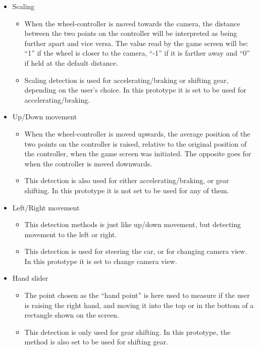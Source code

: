 \pagebreak[4]
\begin{itemize}
\item Scaling
	\begin{itemize}
	\item When the wheel-controller is moved towards the camera, the distance between the two points on the controller will be interpreted as being further apart and vice versa. The value read by the game screen will be: “1” if the wheel is closer to the camera, “-1” if it is farther away and “0” if held at the default distance.
	
	\item Scaling detection is used for accelerating/braking or shifting gear, depending on the user’s choice. In this prototype it is set to be used for accelerating/braking.
	\end{itemize}
	
\item Up/Down movement
	\begin{itemize}
	\item When the wheel-controller is moved upwards, the average position of the two points on the controller is raised, relative to the original position of the controller, when the game screen was initiated. The opposite goes for when the controller is moved downwards.
	
	\item This detection is also used for either accelerating/braking, or gear shifting. In this prototype it is not set to be used for any of them.

	\end{itemize}
	
\item Left/Right movement
	\begin{itemize}
	\item This detection methods is just like up/down movement, but detecting movement to the left or right.
	
	\item This detection is used for steering the car, or for changing camera view. In this prototype it is set to change camera view.
	\end{itemize}
	
\item Hand slider
	\begin{itemize}
	\item The point chosen as the “hand point” is here used to measure if the user is raising the right hand, and moving it into the top or in the bottom of a rectangle shown on the screen.
	
	\item This detection is only used for gear shifting. In this prototype, the method is also set to be used for shifting gear.
	\end{itemize}
\end{itemize}

